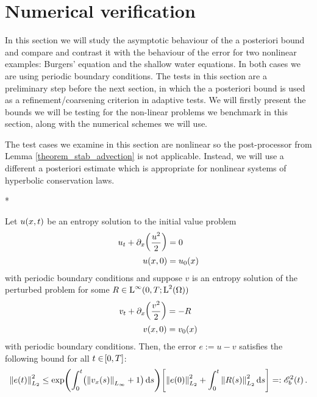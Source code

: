 \documentclass[final]{amsart}
\numberwithin{equation}{section}
\begin{document}
\section{Numerical verification}\label{sec:numerical_verification}
In this section we will study the asymptotic behaviour of the a
posteriori bound and compare and contrast it with the behaviour of the
error for two nonlinear examples: Burgers' equation and the shallow
water equations.  In both cases we are using periodic boundary
conditions.  The tests in this section are a preliminary step before
the next section, in which the a posteriori bound is used as a
refinement/coarsening criterion in adaptive tests.  We will firstly
present the bounds we will be testing for the non-linear problems we
benchmark in this section, along with the numerical schemes we will
use.
\begin{Rem}
 The test cases we examine in this section are nonlinear so the
 post-processor from Lemma \ref{theorem_stab_advection} is not
 applicable.  Instead, we will use a different a posteriori estimate
 which is appropriate for nonlinear systems of hyperbolic conservation
 laws.
\end{Rem}
\/*
\begin{Lem}\label{theorem_stab_burgers}
Let $u\!\left({x,t}\right)$ be an entropy solution to the initial value problem 
\begin{equation}
\begin{aligned}
u_t+\partial_x\!\left({\frac{u^2}{2}}\right)&=0\\
u\!\left({x,0}\right)&=u_0\!\left({x}\right)
\end{aligned}
\end{equation}
with periodic boundary conditions and suppose $v$ is an entropy
solution of the perturbed problem for some $R \in \operatorname L^{\infty}(0,T;
\operatorname L^{2}(\Omega))$
\begin{equation}
\begin{aligned}
v_t+\partial_x\!\left({\frac{v^2}{2}}\right)&=-R\\
v\!\left({x,0}\right)&=v_0\!\left({x}\right)
\end{aligned}
\end{equation}
with periodic boundary conditions. Then, the error $e:=u-v$ satisfies
the following bound for all $t\in\!\left[{0,T}\right]$:
\begin{equation}
\begin{aligned}
\Norm{e\qp{t}}^2_{L_2}\leq \exp\qp{\int_0^t\qp{\Norm{v_x\qp{s}}_{L_\infty}+1}\mathrm{d}s}\qb{\Norm{e\qp{0}}_{L_2}^2+\int_0^t\Norm{R\qp{s}}^2_{L_2}\mathrm{d}s}=: \cE_b^2\qp{t}.
\end{aligned}
\end{equation}
\end{Lem}
\end{document}
